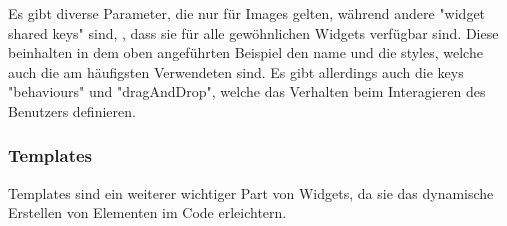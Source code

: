 Es gibt diverse Parameter, die nur für Images gelten, während andere "widget shared keys" sind, \dah, dass sie für alle gewöhnlichen Widgets verfügbar sind.
Diese beinhalten in dem oben angeführten Beispiel den name und die styles, welche auch die am häufigsten Verwendeten sind.
Es gibt allerdings auch die keys "behaviours" und "dragAndDrop", welche das Verhalten beim Interagieren des Benutzers definieren.

\renewcommand{\kapitelautor}{Autor: Felix Zwickelstorfer}
\subsubsection{Templates}\label{sec:templates}
\renewcommand{\kapitelautor}{Autor: Felix Zwickelstorfer}

Templates sind ein weiterer wichtiger Part von Widgets, da sie das dynamische Erstellen von Elementen im Code erleichtern.
